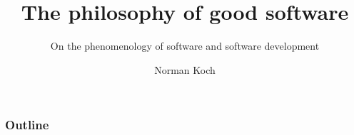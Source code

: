 \documentclass[aspectratio=169]{beamer}
\begin{document}
\author{Norman Koch}
\title{The philosophy of good software}
\subtitle{On the phenomenology of software and software development}

\maketitle

\begin{frame}
	\frametitle{Outline}
	\begin{minipage}{\textwidth}
		\tableofcontents
	\end{minipage}
\end{frame}




%


\printbibliography[title={Sources}]
\end{document}

